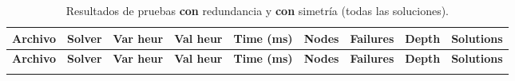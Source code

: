\setlength{\tabcolsep}{4pt}
\begin{longtable}{l l l l r r r r r}
    \caption{Resultados de pruebas \textbf{con} redundancia y \textbf{con} simetría (todas las soluciones).}\label{tab:pruebas-jobshop_mantenimiento-on-on-all}                \\
    \toprule
    \textbf{Archivo} & \textbf{Solver} & \textbf{Var heur} & \textbf{Val heur} & \textbf{Time (ms)} & \textbf{Nodes} & \textbf{Failures} & \textbf{Depth} & \textbf{Solutions} \\
    \midrule
    \endfirsthead
    \toprule
    \textbf{Archivo} & \textbf{Solver} & \textbf{Var heur} & \textbf{Val heur} & \textbf{Time (ms)} & \textbf{Nodes} & \textbf{Failures} & \textbf{Depth} & \textbf{Solutions} \\
    \midrule
    \endhead
    \bottomrule
    \endlastfoot


\end{longtable}
